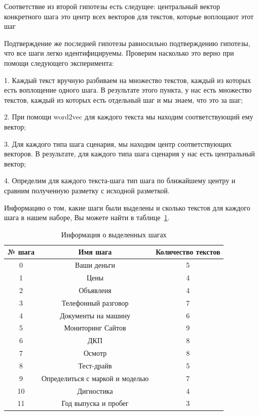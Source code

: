 \documentclass[12pt]{article}
\begin{document}
Соответствие из второй гипотезы есть следущее: центральный вектор конкретного шага это центр всех векторов для текстов, которые воплощают этот шаг

Подтверждение же последней гипотезы равносильно подтверждению гипотезы, что все шаги легко идентифицируемы. Проверим насколько это верно при помощи следующего эксперимента:

1. Каждый текст вручную разбиваем на множество текстов, каждый из которых есть воплощение одного шага. В результате этого пункта, у нас есть множество текстов, каждый из которых есть отдельный шаг и мы знаем, что это за шаг;

2. При помощи word2vec для каждого текста мы находим соответствующий ему вектор;

3.  Для каждого типа шага сценария, мы находим центр соответствующих векторов. В результате, для каждого типа шага сценария у нас есть центральный вектор;

4. Определим для каждого текста-шага тип шага по ближайшему центру и сравним полученную разметку с исходной разметкой.

Информацию о том, какие шаги были выделены и сколько текстов для каждого шага в нашем наборе, Вы можете найти в таблице~\ref{table:2.0}.

\begin{table}[h!]
\centering
\begin{tabular}{||c|c|c||} 
 \hline
 № шага & Имя шага &Количество текстов\\
 \hline
 0&  Ваши деньги&5\\ 
 1&  Цены&4  \\ 
 2&  Объявлеия&4  \\ 
 3&  Телефонный разговор&7  \\ 
  4&  Документы на машину&6  \\ 
 5&  Мониторинг Сайтов&9\\ 
 6&  ДКП&8  \\ 
 7&  Осмотр&8  \\ 
 8&  Тест-драйв&5  \\ 
 9&  Определиться с маркой и моделью&7  \\ 
 10&  Дигностика&4  \\ 
 11&  Год выпуска и пробег&3  \\ 
 \hline
\end{tabular}
\caption{Информация о выделенных шагах}
\label{table:2.0}
\end{table}
\end{document}
